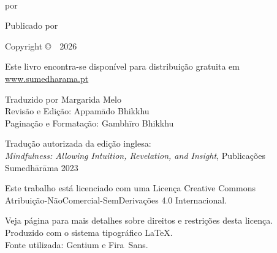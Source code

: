 \cleartoverso
\thispagestyle{empty}

{\copyrightsize
\centering
\setlength{\parindent}{0pt}%
\setlength{\parskip}{0.8\baselineskip}%

\thetitle\\
por \theauthor

Publicado por \thePublisher


Copyright \copyright\ \thePublisher\ 2026

Este livro encontra-se disponível para distribuição gratuita em\\
\href{https://sumedharama.pt}{www.sumedharama.pt}

Traduzido por Margarida Melo\\
Revisão e Edição: Appamādo Bhikkhu\\
Paginação e Formatação: Gambhīro Bhikkhu

Tradução autorizada da edição inglesa:\\
\emph{Mindfulness: Allowing Intuition, Revelation, and Insight}, Publicações Sumedhārāma 2023

\vfill

{\footnotesize

Este trabalho está licenciado com uma Licença Creative Commons\\
Atribuição-NãoComercial-SemDerivações 4.0 Internacional.

Veja página \pageref{copyright-details} para mais detalhes sobre direitos e restrições desta licença.\\
Produzido com o sistema tipográfico \LaTeX.\\
Fonte utilizada: Gentium e Fira~Sans.

\theEditionInfo

}}
